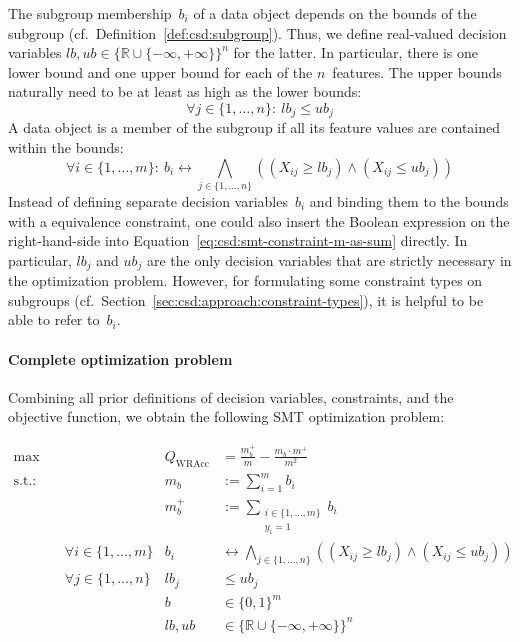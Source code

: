 \documentclass{article}
\theoremstyle{definition}
\begin{document}
The subgroup membership~$b_i$ of a data object depends on the bounds of the subgroup (cf.~Definition~\ref{def:csd:subgroup}).
Thus, we define real-valued decision variables $\mathit{lb}, \mathit{ub} \in \{\mathbb{R} \cup \{-\infty, +\infty\}\}^n$ for the latter.
In particular, there is one lower bound and one upper bound for each of the $n$~features.
The upper bounds naturally need to be at least as high as the lower bounds:
%
\begin{equation}
	\forall j \in \{1, \dots, n\}:~ \mathit{lb}_j\leq \mathit{ub}_j
	\label{eq:csd:smt-constraint-bounds-monotonic}
\end{equation}
%
A data object is a member of the subgroup if all its feature values are contained within the bounds:
%
\begin{equation}
	\forall i \in \{1, \dots, m\}:~ b_i\leftrightarrow \bigwedge_{j \in \{1, \dots, n\}} \left( \left( X_{ij} \geq \mathit{lb}_j \right) \land \left( X_{ij} \leq \mathit{ub}_j \right) \right)
	\label{eq:csd:smt-constraint-subgroup-membership}
\end{equation}
%
Instead of defining separate decision variables~$b_i$ and binding them to the bounds with a equivalence constraint, one could also insert the Boolean expression on the right-hand-side into Equation~\ref{eq:csd:smt-constraint-m-as-sum} directly.
In particular, $\mathit{lb}_j$ and $\mathit{ub}_j$ are the only decision variables that are strictly necessary in the optimization problem.
However, for formulating some constraint types on subgroups (cf.~Section~\ref{sec:csd:approach:constraint-types}), it is helpful to be able to refer to~$b_i$.

\paragraph{Complete optimization problem}

Combining all prior definitions of decision variables, constraints, and the objective function, we obtain the following SMT optimization problem:

\begin{equation}
	\begin{aligned}
		\max &\quad & Q_{\text{WRAcc}} &= \frac{m_b^+}{m} - \frac{m_b \cdot m^+}{m^2} \\
		\text{s.t.:} &\quad & m_b &:= \sum_{i=1}^{m} b_i \\
		&\quad & m_b^+ &:= \sum_{\substack{i \in \{1, \dots, m\} \\ y_i = 1 }} b_i \\
		&\quad \forall i \in \{1, \dots, m\} & b_i &\leftrightarrow \bigwedge_{j \in \{1, \dots, n\}} \left( \left( X_{ij} \geq \mathit{lb}_j \right) \land \left( X_{ij} \leq \mathit{ub}_j \right) \right) \\
		&\quad \forall j \in \{1, \dots, n\} & \mathit{lb}_j &\leq \mathit{ub}_j \\
		&\quad & b &\in \{0, 1\}^m \\
		&\quad & \mathit{lb}, \mathit{ub} &\in \{\mathbb{R} \cup \{-\infty, +\infty\}\}^n
	\end{aligned}
	\label{eq:csd:smt-problem-unconstrained-complete}
\end{equation}
\end{document}
